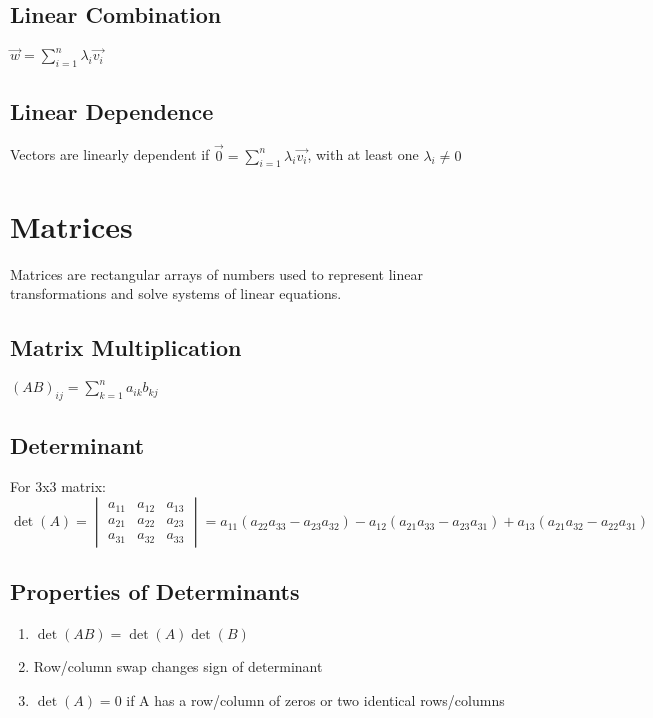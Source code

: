 \documentclass[12pt,a4paper]{article}
\begin{document}
\subsection{Linear Combination}
$\vec{w} = \sum_{i=1}^n \lambda_i \vec{v_i}$

\subsection{Linear Dependence}
Vectors are linearly dependent if $\vec{0} = \sum_{i=1}^n \lambda_i \vec{v_i}$, with at least one $\lambda_i \neq 0$

\section{Matrices}
\begin{info-box}
Matrices are rectangular arrays of numbers used to represent linear transformations and solve systems of linear equations.
\end{info-box}

\subsection{Matrix Multiplication}
$(AB)_{ij} = \sum_{k=1}^n a_{ik} b_{kj}$

\subsection{Determinant}
For 3x3 matrix:
\[
\det(A) = 
\begin{vmatrix}
a_{11} & a_{12} & a_{13} \\
a_{21} & a_{22} & a_{23} \\
a_{31} & a_{32} & a_{33}
\end{vmatrix}
= a_{11}(a_{22}a_{33} - a_{23}a_{32}) - a_{12}(a_{21}a_{33} - a_{23}a_{31}) + a_{13}(a_{21}a_{32} - a_{22}a_{31})
\]

\subsection{Properties of Determinants}
\begin{enumerate}
\item $\det(AB) = \det(A)\det(B)$
\item Row/column swap changes sign of determinant
\item $\det(A) = 0$ if A has a row/column of zeros or two identical rows/columns
\end{enumerate}
\end{document}
